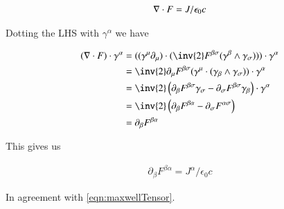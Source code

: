 \documentclass{article}
\begin{document}
\begin{align*}
\nabla \cdot F = J/\epsilon_0 c
\end{align*}

Dotting the LHS with $\gamma^\alpha$ we have

\begin{align*}
(\grad \cdot F) \cdot \gamma^\alpha 
&=
((\gamma^\mu \partial_\mu) \cdot (\inv{2} F^{\beta\sigma} (\gamma^\beta \wedge \gamma_\sigma))) \cdot \gamma^\alpha \\
&=
\inv{2} \partial_\mu F^{\beta\sigma} 
(\gamma^\mu \cdot (\gamma_\beta \wedge \gamma_\sigma)) \cdot \gamma^\alpha \\
&=
\inv{2} 
\left( \partial_\beta F^{\beta\sigma} \gamma_\sigma -\partial_\sigma F^{\beta\sigma} \gamma_\beta \right) \cdot \gamma^\alpha \\
&=
\inv{2} 
\left( \partial_\beta F^{\beta\alpha} -\partial_\sigma F^{\alpha\sigma} \right) \\
&=
\partial_\beta F^{\beta\alpha} 
\end{align*}

This gives us

\begin{align}
\partial_\beta F^{\beta\alpha} = J^\alpha/\epsilon_0 c
\end{align}

In agreement with \ref{eqn:maxwellTensor}.



\end{document}
